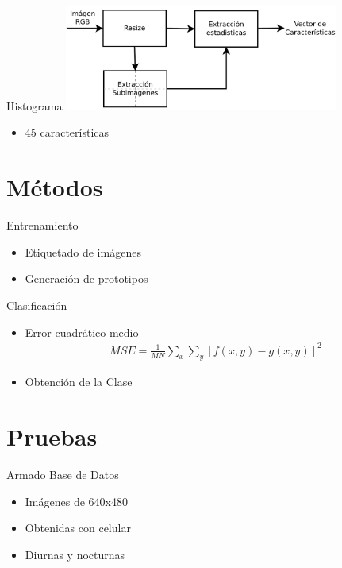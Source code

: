 \documentclass[spanish]{beamer}
\begin{document}
\begin{frame}{Histograma}
  \includegraphics[width=9cm]{../diagramas/procesoestadisticas}
  \begin{itemize}
  \item 45 características
  \end{itemize}
\end{frame}

\section[Outline]{Métodos}

\begin{frame}{Entrenamiento}
  \begin{itemize}
  \item Etiquetado de imágenes
  \item Generación de prototipos
  \end{itemize}
\end{frame}

\begin{frame}{Clasificación}
  \begin{itemize}
  \item Error cuadrático medio
    \begin{align*}
      MSE = \frac{1}{MN} \sum_x\sum_y [ f(x,y) - g(x,y) ]^{2}
    \end{align*}
  \item Obtención de la Clase
  \end{itemize}
\end{frame}

\section[Outline]{Pruebas}

\begin{frame}{Armado Base de Datos}
  \begin{itemize}
  \item Imágenes de 640x480
  \item Obtenidas con celular
  \item Diurnas y nocturnas 
  \end{itemize}
\end{frame}
\end{document}
